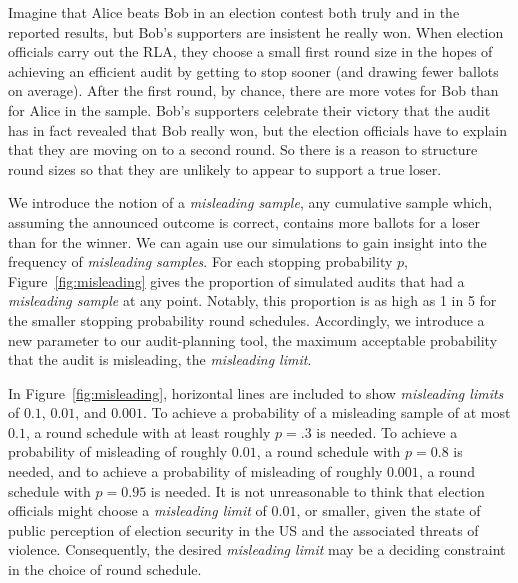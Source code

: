Imagine that Alice beats Bob in an election contest both truly and in the reported results, but Bob's supporters are insistent he really won. When election officials carry out the RLA, they choose a small first round size in the hopes of achieving an efficient audit by getting to stop sooner (and drawing fewer ballots on average). 
After the first round, by chance, there are more votes for Bob than for Alice in the sample. Bob's supporters celebrate their victory that the audit has in fact revealed that Bob really won, but the election officials have to explain that they are moving on to a second round. 
So there is a reason to structure round sizes so that they are unlikely to appear to support a true loser.


We introduce the notion of a \emph{misleading sample}, any cumulative sample which, assuming the announced outcome is correct, contains more ballots for a loser than for the winner.
We can again use our simulations to gain insight into the frequency of \emph{misleading samples}.
For each stopping probability $p$, Figure~\ref{fig:misleading} gives the proportion of simulated audits that had a \emph{misleading sample} at any point. 
Notably, this proportion is as high as 1 in 5 for the smaller stopping probability round schedules.
Accordingly, we introduce a new parameter to our audit-planning tool, the maximum acceptable probability that the audit is misleading, the \emph{misleading limit}.

In Figure~\ref{fig:misleading}, horizontal lines are included to show \emph{misleading limits} of $0.1$, $0.01$, and $0.001$.
To achieve a probability of a misleading sample of at most $0.1$, a round schedule with at least roughly $p=.3$ is needed.
To achieve a probability of misleading of roughly $0.01$, a round schedule with $p=0.8$ is needed, and to achieve a probability of misleading of roughly $0.001$, a round schedule with $p=0.95$ is needed.
It is not unreasonable to think that election officials might choose a \emph{misleading limit} of $0.01$, or smaller, given the state of public perception of election security in the US and the associated threats of violence.
Consequently, the desired \emph{misleading limit} may be a deciding constraint in the choice of round schedule. 

